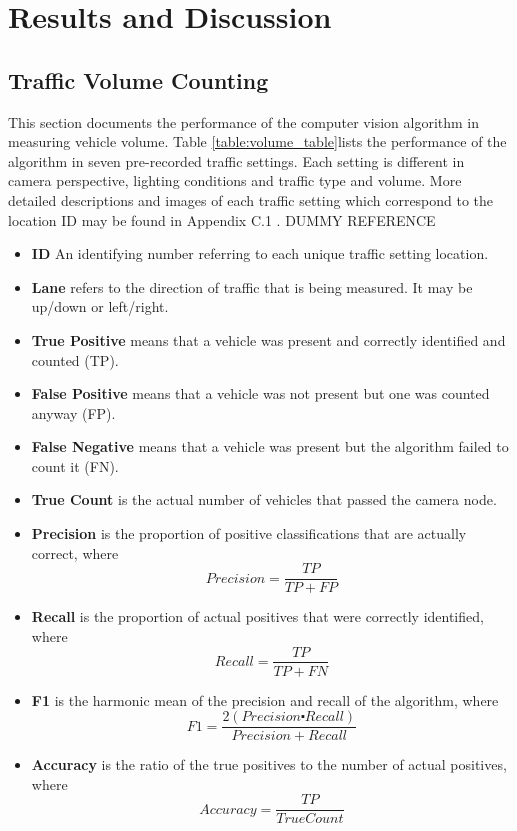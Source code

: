 \chapter{Results and Discussion}

\section{Traffic Volume Counting}

This section documents the performance of the computer vision algorithm in measuring vehicle volume. Table \ref{table:volume_table}lists the performance of the algorithm in seven pre-recorded traffic settings. Each setting is different in camera perspective, lighting conditions and traffic type and volume. More detailed descriptions and images of each traffic setting which correspond to the location ID may be found in Appendix C.1 . \cite{udacity_cv} DUMMY REFERENCE

\begin{itemize}
\item\textbf{ID} An identifying number referring to each unique traffic setting location.
\item\textbf{Lane} refers to the direction of traffic that is being measured. It may be up/down or left/right.
\item\textbf{True Positive} means that a vehicle was present and correctly identified and counted (TP).
\item\textbf{False Positive} means that a vehicle was not present but one was counted anyway (FP).
\item\textbf{False Negative} means that a vehicle was present but the algorithm failed to count it (FN).
\item\textbf{True Count} is the actual number of vehicles that passed the camera node. 
\item\textbf{Precision} is the proportion of positive classifications that are actually correct, where \[Precision = \frac{TP}{TP + FP}\]
\item\textbf{Recall} is the proportion of actual positives that were correctly identified, where \[Recall = \frac{TP}{TP + FN}\]
\item\textbf{F1} is the harmonic mean of the precision and recall of the algorithm, where \[F1 = \frac{2(Precision \centerdot Recall)}{Precision + Recall}\]
\item\textbf{Accuracy} is the ratio of the true positives to the number of actual positives, where \[Accuracy = \frac{TP}{True Count}\]
\end{itemize}



